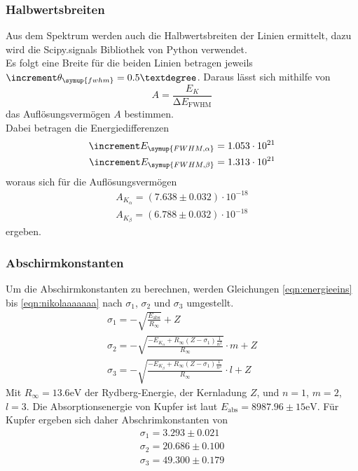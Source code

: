   \subsubsection{Halbwertsbreiten}
    Aus dem Spektrum werden auch die Halbwertsbreiten der Linien ermittelt, dazu wird die Scipy.signals Bibliothek von Python 
    verwendet. \\
    Es folgt eine Breite für die beiden Linien betragen jeweils $\increment \theta_{\symup{fwhm}} = 0.5 °$. 
    Daraus lässt sich mithilfe von
    \begin{equation*}
      A = \frac{E_K}{\increment E_{\text{FWHM}}}
    \end{equation*}
    das Auflösungsvermögen $A$ bestimmen. \\
    Dabei betragen die Energiedifferenzen
    \begin{align*}
      \increment E_{\symup{FWHM, \alpha}} = 1.053 \cdot 10^{21}\\ 
      \increment E_{\symup{FWHM, \beta}} = 1.313 \cdot 10^{21}\\
    \end{align*}
    woraus sich für die Auflösungsvermögen
    \begin{align*}
      A_{K_{\alpha}} = (7.638 \pm 0.032) \cdot 10^{-18} \\
      A_{K_{\beta}} = (6.788 \pm 0.032) \cdot 10^{-18}
    \end{align*}
    ergeben.

  \subsubsection{Abschirmkonstanten}
    Um die Abschirmkonstanten zu berechnen, werden Gleichungen \eqref{eqn:energieeins} bis \eqref{eqn:nikolaaaaaaa}
        nach $\sigma_1$, $\sigma_2$ und $\sigma_3$ umgestellt.\\
    \begin{align*}
      \sigma_1 = - \sqrt{\frac{E_{\text{abs}}}{R_{\infty}}} + Z\\
      \sigma_2 = - \sqrt{\frac{- E_{K_{\alpha}} + R_{\infty} (Z - \sigma_1) \frac{1}{n^2}}{R_{\infty}}} \cdot m + Z\\
      \sigma_3 = - \sqrt{\frac{- E_{K_{\beta}} + R_{\infty} (Z - \sigma_1) \frac{1}{n^2}}{R_{\infty}}} \cdot l + Z
    \end{align*}
    Mit $R_{\infty} = 13.6 \text{eV}$ der Rydberg-Energie, der Kernladung $Z$, und $n = 1$, $m = 2$, $l = 3$. 
    Die Absorptionsenergie von Kupfer ist laut \cite{nist} $E_{\text{abs}} = 8987.96 \pm 15 \text{eV}$.
    Für Kupfer ergeben sich daher Abschrimkonstanten von
    \begin{align*}
      \sigma_1 = 3.293 \pm 0.021\\
      \sigma_2 = 20.686 \pm 0.100\\
      \sigma_3 = 49.300 \pm 0.179
    \end{align*}

